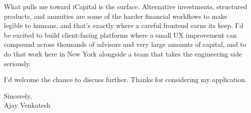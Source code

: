 \documentclass[letterpaper,11pt]{article}
\begin{document}
What pulls me toward iCapital is the surface. Alternative investments, structured products, and annuities are some of the harder financial workflows to make legible to humans, and that's exactly where a careful frontend earns its keep. I'd be excited to build client-facing platforms where a small UX improvement can compound across thousands of advisors and very large amounts of capital, and to do that work here in New York alongside a team that takes the engineering side seriously.

I'd welcome the chance to discuss further. Thanks for considering my application.

\vspace{12pt}
Sincerely, \\
Ajay Venkatesh
\end{document}
